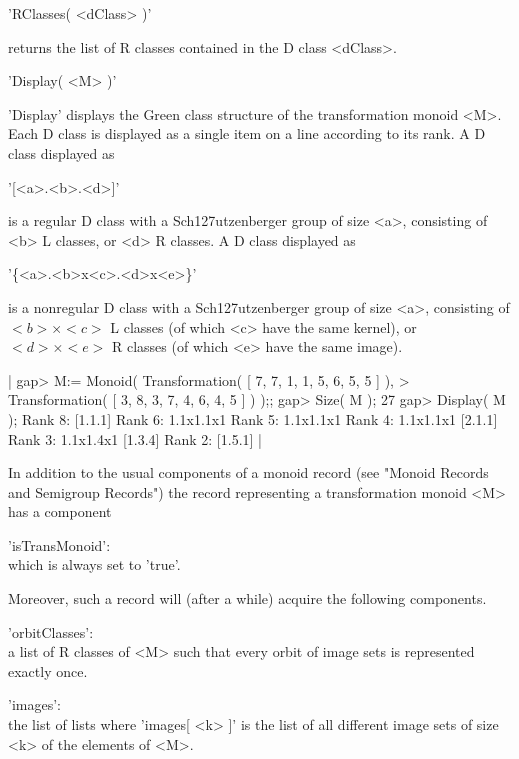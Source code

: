 \vspace{5mm}
'RClasses( <dClass> )'

returns the list of R classes contained in the D class <dClass>.


'Display( <M> )'

'Display' displays the Green class structure of the transformation monoid
<M>.  Each D class is displayed  as a single item on  a line according to
its rank.  A D class displayed as

'[<a>.<b>.<d>]'

is a regular D  class with a Sch\accent127utzenberger  group of size <a>,
consisting of <b> L classes, or <d> R classes.  A D class displayed as 

'\{<a>.<b>x<c>.<d>x<e>\}'

is  a nonregular D  class with  a  Sch\accent127utzenberger group of size
<a>, consisting of $<b> \times <c>$ L classes (of which <c> have the same
kernel), or   $<d> \times <e>$ R  classes   (of which <e> have   the same
image).

|    gap> M:= Monoid( Transformation( [ 7, 7, 1, 1, 5, 6, 5, 5 ] ), 
    > Transformation( [ 3, 8, 3, 7, 4, 6, 4, 5 ] ) );;
    gap> Size( M );
    27
    gap> Display( M );
    Rank 8: [1.1.1] 
    Rank 6: {1.1x1.1x1} 
    Rank 5: {1.1x1.1x1} 
    Rank 4: {1.1x1.1x1} [2.1.1] 
    Rank 3: {1.1x1.4x1} [1.3.4] 
    Rank 2: [1.5.1] |


In addition  to  the usual  components  of a  monoid record  (see "Monoid
Records and Semigroup Records") the  record representing a transformation
monoid <M> has a component

'isTransMonoid':\\
        which is always set to 'true'.
        
Moreover,  such  a  record will  (after  a while)   acquire the following
components.

'orbitClasses':\\
        a list of R classes of <M> such that every orbit of image sets is
        represented exactly once.

'images':\\
        the list of  lists  where 'images[ <k>    ]' is the  list  of all
        different image sets of size <k> of the elements of <M>.
        
